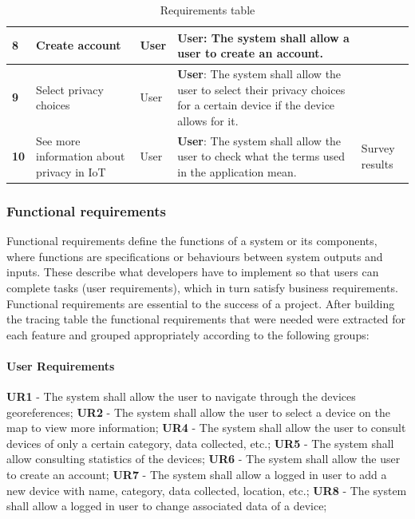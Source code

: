 \begin{table}[H]
\begin{adjustbox}{width=1.2\textwidth,center=\textwidth}
\begin{tabular}{|l|p{}|p{}|p{}|p{}|}
        \hline
        \textbf{8} & Create account & User & \textbf{User}: The system shall allow a user to create an account. &  \\
        \hline
        \textbf{9} & Select privacy choices & User & \textbf{User}: The system shall allow the user to select their privacy choices for a certain device if the device allows for it. &  \\
        \hline
        \textbf{10} & See more information about privacy in IoT & User & \textbf{User}: The system shall allow the user to check what the terms used in the application mean. & Survey results \\
        \hline
    \end{tabular}
    \end{adjustbox}
    \caption{Requirements table}
    \label{table:table1}
\end{table}

\subsubsection*{Functional requirements}

Functional requirements define the functions of a system or its components,
where functions are specifications or behaviours between system outputs and
inputs. These describe what developers have to implement
so that users can complete tasks (user requirements), which in turn satisfy
business requirements. Functional requirements are
essential to the success of a project.
After building the tracing table the functional requirements that were needed
were extracted for each feature and grouped appropriately according to the
following groups:

\paragraph*{User Requirements}

\textbf{UR1} - The system shall allow the user to navigate through the devices georeferences;
\newline
\textbf{UR2} - The system shall allow the user to select a device on the map to view more information;
\newline
\textbf{UR4} - The system shall allow the user to consult devices of only a certain category, data collected, etc.;
\newline
\textbf{UR5} - The system shall allow consulting statistics of the devices;
\newline
\textbf{UR6} - The system shall allow the user to create an account;
\newline
\textbf{UR7} - The system shall allow a logged in user to add a new device with name, category, data collected, location, etc.;
\newline
\textbf{UR8} - The system shall allow a logged in user to change associated data of a device;

